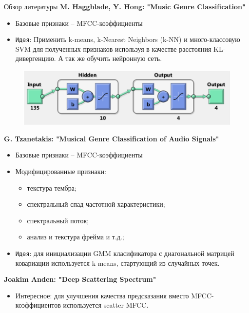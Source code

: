 \documentclass[xcolor=svgnames,handout]{beamer}
\begin{document}
\begin{frame}{Обзор литературы}
  \textbf{M. Haggblade, Y. Hong: "Music Genre Classification"}
  \begin{itemize}
      \item Базовые признаки -- MFCC-коэффициенты
      \item \texttt{Идея}: Применить k-means, k-Nearest Neighbors (k-NN) и много-классовую SVM для полученных признаков используя в качестве расстояния KL-дивергенцию. А так же обучить нейронную сеть.
  \end{itemize}
    \begin{figure}[t]
    \centering
    \includegraphics[width = 0.95\linewidth]{nn-structure}
  \end{figure}
\end{frame}
\begin{frame}
  \textbf{G. Tzanetakis: "Musical Genre Classification of Audio Signals"}
  \begin{itemize}
      \item Базовые признаки -- MFCC-коэффициенты
      \item Модифицированные признаки:
      \begin{itemize}
          \item текстура тембра;
          \item спектральный спад частотной характеристики;
          \item спектральный поток;
          \item анализ и текстура фрейма и т.д.;
      \end{itemize}
      \item \texttt{Идея}: для инициализации GMM класификатора с диагональной матрицей ковариации используется k-means, стартующий из случайных точек.
  \end{itemize}
  
  \textbf{Joakim Anden: "Deep Scattering Spectrum"}
  \begin{itemize}
      \item Интересное: для улучшения качества предсказания вместо MFCC-коэффициентов используется scatter MFCC.
  \end{itemize}
\end{frame}  
\end{document}
